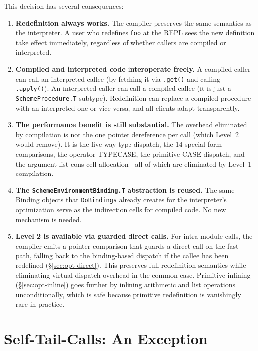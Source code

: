\documentclass[12pt]{report}
\begin{document}
This decision has several consequences:

\begin{enumerate}
\item \textbf{Redefinition always works.}  The compiler preserves
  the same semantics as the interpreter.  A user who redefines
  \texttt{foo} at the REPL sees the new definition take effect
  immediately, regardless of whether callers are compiled or
  interpreted.

\item \textbf{Compiled and interpreted code interoperate freely.}
  A compiled caller can call an interpreted callee (by fetching it
  via \texttt{.get()} and calling \texttt{.apply()}).  An
  interpreted caller can call a compiled callee (it is just a
  \texttt{SchemeProcedure.T} subtype).  Redefinition can replace
  a compiled procedure with an interpreted one or vice versa, and
  all clients adapt transparently.

\item \textbf{The performance benefit is still substantial.}
  The overhead eliminated by compilation is not the one pointer
  dereference per call (which Level~2 would remove).  It is the
  five-way type dispatch, the 14 special-form comparisons, the
  operator TYPECASE, the primitive CASE dispatch, and the
  argument-list cons-cell allocation---all of which are eliminated
  by Level~1 compilation.

\item \textbf{The \texttt{SchemeEnvironmentBinding.T} abstraction
  is reused.}  The same Binding objects that \texttt{DoBindings}
  already creates for the interpreter's optimization serve as the
  indirection cells for compiled code.  No new mechanism is needed.

\item \textbf{Level 2 is available via guarded direct calls.}
  For intra-module calls, the compiler emits a pointer comparison
  that guards a direct call on the fast path, falling back to
  the binding-based dispatch if the callee has been redefined
  (\S\ref{sec:opt-direct}).  This preserves full redefinition
  semantics while eliminating virtual dispatch overhead in the
  common case.  Primitive inlining (\S\ref{sec:opt-inline})
  goes further by inlining arithmetic and list operations
  unconditionally, which is safe because primitive redefinition
  is vanishingly rare in practice.
\end{enumerate}

\section{Self-Tail-Calls: An Exception}
\end{document}
